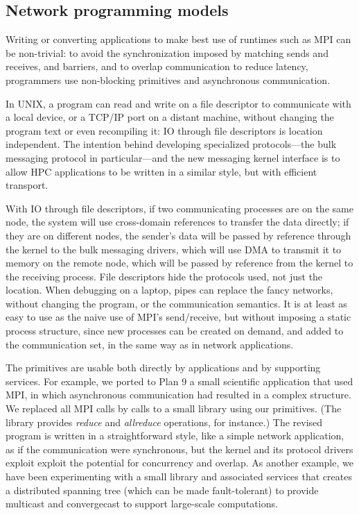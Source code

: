 \subsection{Network programming models}
Writing or converting applications to make best use of runtimes such
as MPI can be non-trivial: to avoid the synchronization imposed by
matching sends and receives, and barriers, and to overlap
communication to reduce latency, programmers use non-blocking
primitives and asynchronous communication.

In UNIX, a program can read and write on a file descriptor to
communicate with a local device, or a TCP/IP port on a distant
machine, without changing the program text or even recompiling it: IO
through file descriptors is location independent.  The intention
behind developing specialized protocols---the bulk messaging protocol
in particular---and the new messaging kernel interface is to allow HPC
applications to be written in a similar style, but with efficient
transport.  

With IO through file descriptors, if two communicating
processes are on the same node, the system will use cross-domain
references to transfer the data directly; if they are on different
nodes, the sender's data will be passed by reference through the
kernel to the bulk messaging drivers, which will use DMA to transmit
it to memory on the remote node, which will be passed by reference
from the kernel to the receiving process.  File descriptors hide the
protocols used, not just the location.  When debugging on a laptop,
pipes can replace the fancy networks, without changing the program, or
the communication semantics.  It is at least as easy to use as the
naive use of MPI's send/receive, but without imposing a static process
structure, since new processes can be created on demand, and added to
the communication set, in the same way as in network applications.

The primitives are usable both directly by applications and by
supporting services.  For example, we ported to Plan 9 a small
scientific application that used MPI, in which asynchronous
communication had resulted in a complex structure.  We replaced all
MPI calls by calls to a small library using our primitives.  (The
library provides \emph{reduce} and \emph{allreduce} operations, for
instance.)  The revised program is written in a straightforward style,
like a simple network application, as if the communication were
synchronous, but the kernel and its protocol drivers exploit exploit
the potential for concurrency and overlap.  As another example, we
have been experimenting with a small library and associated services
that creates a distributed spanning tree (which can be made
fault-tolerant) to provide multicast and convergecast to support
large-scale computations.

